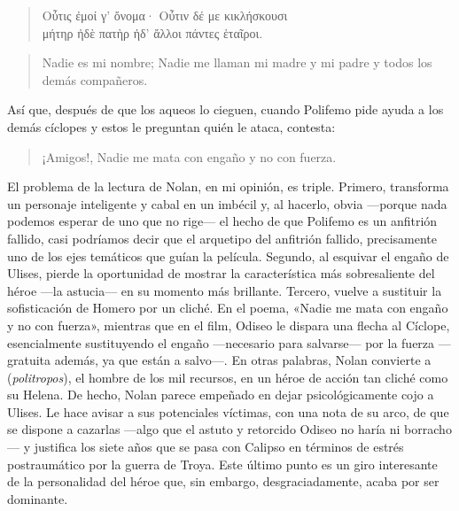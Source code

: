 \begin{verse}
\foreignlanguage{greek}{Οὖτις ἐμοί γ' ὄνομα· Οὖτιν δέ με κικλήσκουσι\\
μήτηρ ἠδὲ πατὴρ ἠδ' ἄλλοι πάντες ἑταῖροι.}
\end{verse}

\begin{verse}
Nadie es mi nombre; Nadie me llaman mi madre y mi padre y todos los demás compañeros.
\end{verse}

Así que, después de que los aqueos lo cieguen, cuando Polifemo pide ayuda a los demás cíclopes y estos le preguntan quién le ataca, contesta:

\begin{verse}
\end{verse}

\begin{verse}
¡Amigos!, Nadie me mata con engaño y no con fuerza.
\end{verse}

El problema de la lectura de Nolan, en mi opinión, es triple. Primero, transforma un personaje inteligente y cabal en un imbécil y, al hacerlo, obvia ---porque nada podemos esperar de uno que no rige--- el hecho de que Polifemo es un anfitrión fallido, casi podríamos decir que el arquetipo del anfitrión fallido, precisamente uno de los ejes temáticos que guían la película. Segundo, al esquivar el engaño de Ulises, pierde la oportunidad de mostrar la característica más sobresaliente del héroe ---la astucia--- en su momento más brillante. Tercero, vuelve a sustituir la sofisticación de Homero por un cliché. En el poema, «Nadie me mata con engaño y no con fuerza», mientras que en el film, Odiseo le dispara una flecha al Cíclope, esencialmente sustituyendo el engaño ---necesario para salvarse--- por la fuerza ---gratuita además, ya que están a salvo---. En otras palabras, Nolan convierte a  (\emph{politropos}), el hombre de los mil recursos, en un héroe de acción tan cliché como su Helena. De hecho, Nolan parece empeñado en dejar psicológicamente cojo a Ulises. Le hace avisar a sus potenciales víctimas, con una nota de su arco, de que se dispone a cazarlas ---algo que el astuto y retorcido Odiseo no haría ni borracho--- y justifica los siete años que se pasa con Calipso en términos de estrés postraumático por la guerra de Troya. Este último punto es un giro interesante de la personalidad del héroe que, sin embargo, desgraciadamente, acaba por ser dominante. 

